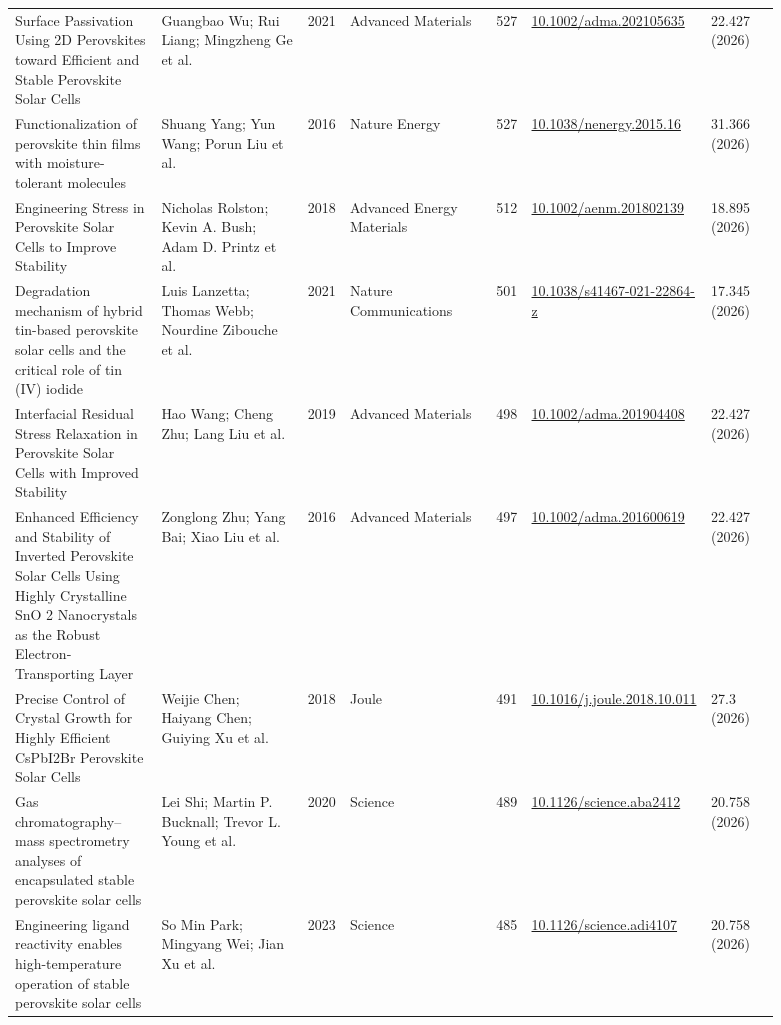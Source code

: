 \documentclass[10pt,a4paper]{article}
\begin{document}
{\begin{longtable}{p{0.197\linewidth}p{0.197\linewidth}p{0.043\linewidth}p{0.197\linewidth}p{0.043\linewidth}p{0.117\linewidth}p{0.098\linewidth}}
Surface Passivation Using 2D Perovskites toward Efficient and Stable Perovskite Solar Cells & Guangbao Wu; Rui Liang; Mingzheng Ge et al. & 2021 & Advanced Materials & 527 & \href{https://doi.org/10.1002/adma.202105635}{10.1002/adma.202105635} & 22.427 (2026) \\
Functionalization of perovskite thin films with moisture-tolerant molecules & Shuang Yang; Yun Wang; Porun Liu et al. & 2016 & Nature Energy & 527 & \href{https://doi.org/10.1038/nenergy.2015.16}{10.1038/nenergy.2015.16} & 31.366 (2026) \\
Engineering Stress in Perovskite Solar Cells to Improve Stability & Nicholas Rolston; Kevin A. Bush; Adam D. Printz et al. & 2018 & Advanced Energy Materials & 512 & \href{https://doi.org/10.1002/aenm.201802139}{10.1002/aenm.201802139} & 18.895 (2026) \\
Degradation mechanism of hybrid tin-based perovskite solar cells and the critical role of tin (IV) iodide & Luis Lanzetta; Thomas Webb; Nourdine Zibouche et al. & 2021 & Nature Communications & 501 & \href{https://doi.org/10.1038/s41467-021-22864-z}{10.1038/s41467-021-22864-z} & 17.345 (2026) \\
Interfacial Residual Stress Relaxation in Perovskite Solar Cells with Improved Stability & Hao Wang; Cheng Zhu; Lang Liu et al. & 2019 & Advanced Materials & 498 & \href{https://doi.org/10.1002/adma.201904408}{10.1002/adma.201904408} & 22.427 (2026) \\
Enhanced Efficiency and Stability of Inverted Perovskite Solar Cells Using Highly Crystalline SnO 2 Nanocrystals as the Robust Electron‐Transporting Layer & Zonglong Zhu; Yang Bai; Xiao Liu et al. & 2016 & Advanced Materials & 497 & \href{https://doi.org/10.1002/adma.201600619}{10.1002/adma.201600619} & 22.427 (2026) \\
Precise Control of Crystal Growth for Highly Efficient CsPbI2Br Perovskite Solar Cells & Weijie Chen; Haiyang Chen; Guiying Xu et al. & 2018 & Joule & 491 & \href{https://doi.org/10.1016/j.joule.2018.10.011}{10.1016/j.joule.2018.10.011} & 27.3 (2026) \\
Gas chromatography–mass spectrometry analyses of encapsulated stable perovskite solar cells & Lei Shi; Martin P. Bucknall; Trevor L. Young et al. & 2020 & Science & 489 & \href{https://doi.org/10.1126/science.aba2412}{10.1126/science.aba2412} & 20.758 (2026) \\
Engineering ligand reactivity enables high-temperature operation of stable perovskite solar cells & So Min Park; Mingyang Wei; Jian Xu et al. & 2023 & Science & 485 & \href{https://doi.org/10.1126/science.adi4107}{10.1126/science.adi4107} & 20.758 (2026) \\

\end{longtable}}
\end{document}
